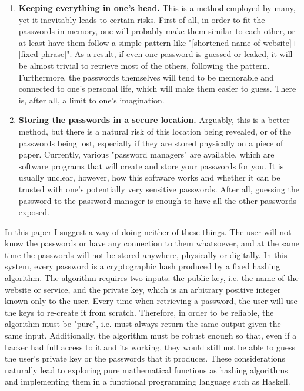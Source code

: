 \documentclass[12pt, a4paper]{article}
\begin{document}
\begin{enumerate}
    \item \textbf{Keeping everything in one's head.} This is a method employed by many, yet it inevitably leads to certain risks. First of all, in order to fit the passwords in memory, one will probably make them similar to each other, or at least have them follow a simple pattern like "[shortened name of website]+[fixed phrase]". As a result, if even one password is guessed or leaked, it will be almost trivial to retrieve most of the others, following the pattern. Furthermore, the passwords themselves will tend to be memorable and connected to one's personal life, which will make them easier to guess. There is, after all, a limit to one's imagination.
    \item \textbf{Storing the passwords in a secure location.} Arguably, this is a better method, but there is a natural risk of this location being revealed, or of the passwords being lost, especially if they are stored physically on a piece of paper. Currently, various "password managers" are available, which are software programs that will create and store your passwords for you. It is usually unclear, however, how this software works and whether it can be trusted with one's potentially very sensitive passwords. After all, guessing the password to the password manager is enough to have all the other passwords exposed.
\end{enumerate}

In this paper I suggest a way of doing neither of these things. The user will not know the passwords or have any connection to them whatsoever, and at the same time the passwords will not be stored anywhere, physically or digitally. In this system, every password is a cryptographic hash produced by a fixed hashing algorithm. The algorithm requires two inputs: the public key, i.e. the name of the website or service, and the private key, which is an arbitrary positive integer known only to the user. Every time when retrieving a password, the user will use the keys to re-create it from scratch. Therefore, in order to be reliable, the algorithm must be "pure", i.e. must always return the same output given the same input. Additionally, the algorithm must be robust enough so that, even if a hacker had full access to it and its working, they would still not be able to guess the user's private key or the passwords that it produces. These considerations naturally lead to exploring pure mathematical functions as hashing algorithms and implementing them in a functional programming language such as Haskell.
\end{document}
